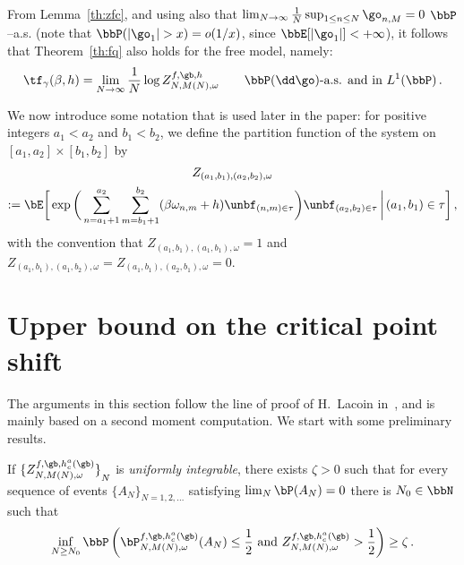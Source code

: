 From Lemma~\ref{th:zfc}, and using also that $\lim_{N\to\infty} \frac1N \sup_{1\leq n\leq N} \go_{n,M} = 0$ $\bbP$--a.s. (note that $\bbP(|\go_1|>x) =o(1/x)$, since $\bbE[|\go_1|]<+\infty$), it follows that Theorem~\ref{th:fq} also holds for the free model, namely:
\begin{equation}\label{eq:saf.2}
\tf_{\gamma}(\beta,h) =\lim_{N\to\infty} \frac{1}{N} \log Z^{f,\gb,h}_{N,M(N),\omega} \qquad \bbP(\dd \go)\text{-a.s. and in } L^1(\bbP)\,.
\end{equation}

\goodbreak
We now introduce some notation that is used later in the paper: for positive integers $a_1 < a_2$ and $b_1 < b_2$, we define the partition function of the system on $[a_1,a_2] \times [b_1,b_2]$ by
\begin{multline}\label{eq:pp}
Z_{(a_1,b_1),(a_2,b_2),\omega}\\
:= \bE \bigg[\exp \bigg(\sum_{n=a_1+1}^{a_2} \sum_{m=b_1+1}^{b_2} (\beta \omega_{n,m} +h) \unbf_{(n,m) \in \tau} \bigg) \unbf_{(a_2,b_2)\in \tau}\,\bigg|\,(a_1,b_1) \in \tau \bigg]\,,
\end{multline}
with the convention that $Z_{(a_1,b_1),(a_1,b_1),\omega} = 1$ and $ Z_{(a_1,b_1),(a_1,b_2),\omega}= Z_{(a_1,b_1),(a_2,b_1),\omega}=0$.



\section{Upper bound on the critical point shift}\label{sec:irrel}

The arguments in this section follow the line of proof of H.~Lacoin in~\cite{cf:Lac}, and is mainly based on a second moment computation. We start with some preliminary results.

\begin{prop}\label{th:unint1}
If ${ \lbrace {Z^{f,\gb,h_c^{a}(\gb)}_{N,M(N),\omega}} \rbrace}_N$ is \emph{uniformly integrable}, there exists $\zeta >0$ such that for every sequence of events $\{A_N\}_{N=1, 2, \ldots}$ satisfying $\lim_{N} \bP(A_N)=0$ there is $N_0\in \bbN $ such that
\begin{equation}\label{eq:unint1}
\inf_{N \ge N_0}
\bbP \left(\bP^{f,\gb,h_c^{a}(\gb)}_{N,M(N),\omega} (A_N)\le \frac{1}{2}
\text{ and } Z^{f,\gb,h_c^{a}(\gb)}_{N,M(N),\omega} > \frac{1}{2} \right) \ge\zeta\,.
\end{equation}
\end{prop}


